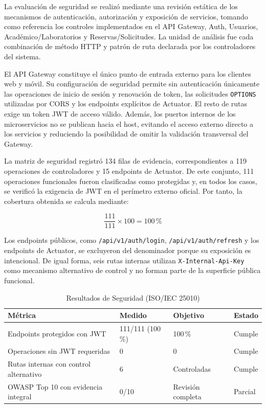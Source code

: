 La evaluación de seguridad se realizó mediante una revisión estática de los
mecanismos de autenticación, autorización y exposición de servicios, tomando
como referencia los controles implementados en el API Gateway, Auth,
Usuarios, Académico/Laboratorios y Reservas/Solicitudes. La unidad de análisis
fue cada combinación de método HTTP y patrón de ruta declarada por los
controladores del sistema.

El API Gateway constituye el único punto de entrada externo para los clientes
web y móvil. Su configuración de seguridad permite sin autenticación
únicamente las operaciones de inicio de sesión y renovación de token, las
solicitudes \texttt{OPTIONS} utilizadas por CORS y los endpoints explícitos
de Actuator. El resto de rutas exige un token JWT de acceso válido. Además,
los puertos internos de los microservicios no se publican hacia el host,
evitando el acceso externo directo a los servicios y reduciendo la posibilidad
de omitir la validación transversal del Gateway.

La matriz de seguridad registró 134 filas de evidencia, correspondientes a
119 operaciones de controladores y 15 endpoints de Actuator. De este conjunto,
111 operaciones funcionales fueron clasificadas como protegidas y, en todos
los casos, se verificó la exigencia de JWT en el perímetro externo oficial.
Por tanto, la cobertura obtenida se calcula mediante:

\[
\frac{111}{111}\times 100 = 100\,\%
\]

Los endpoints públicos, como \texttt{/api/v1/auth/login},
\texttt{/api/v1/auth/refresh} y los endpoints de Actuator, se excluyeron del
denominador porque su exposición es intencional. De igual forma, seis rutas
internas utilizan \texttt{X-Internal-Api-Key} como mecanismo alternativo de
control y no forman parte de la superficie pública funcional.

\begin{table}[htbp]
\centering
\caption{Resultados de Seguridad (ISO/IEC 25010)}
\label{tab:iso-seguridad}
\begin{tabular}{llll}
\toprule
Métrica & Medido & Objetivo & Estado \\
\midrule
Endpoints protegidos con JWT & 111/111 (100\,\%) & 100\,\% & Cumple \\
Operaciones sin JWT requeridas & 0 & 0 & Cumple \\
Rutas internas con control alternativo & 6 & Controladas & Cumple \\
OWASP Top 10 con evidencia integral & 0/10 & Revisión completa & Parcial \\
\bottomrule
\end{tabular}
\end{table}

